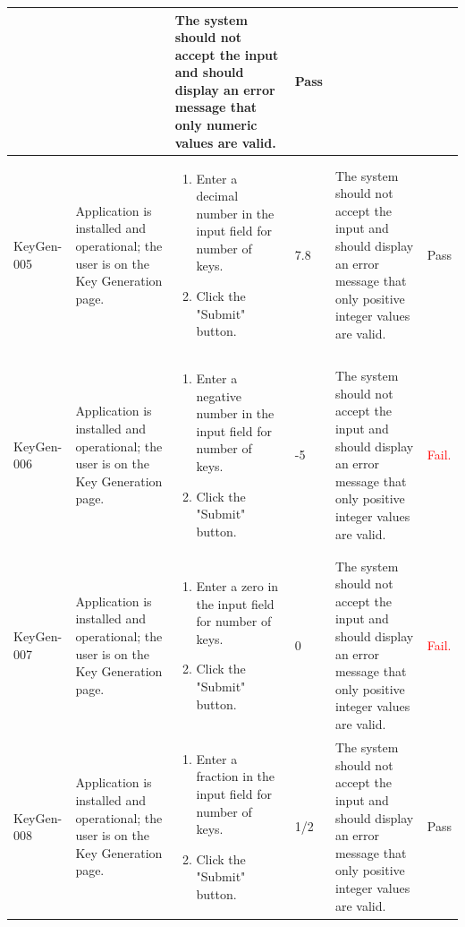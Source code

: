 \documentclass[]{final_report}
\theoremstyle{definition}
\begin{document}
\begin{longtable}{|l|p{2.5cm}|p{2.5cm}|p{2.5cm}|p{2.5cm}|p{3cm}|}
\begin{enumerate}
  \end{enumerate} &  & The system should not accept the input and should display an error message that only numeric values are valid. & Pass \\
  \hline
   KeyGen-005 & Application is installed and operational; the user is on the Key Generation page. & 
  \begin{enumerate}
  \item Enter a decimal number in the input field for number of keys.
  \item Click the "Submit" button.
  \end{enumerate} & 7.8  & The system should not accept the input and should display an error message that only positive integer values are valid. & Pass \\
  \hline
     KeyGen-006 & Application is installed and operational; the user is on the Key Generation page. & 
  \begin{enumerate}
  \item Enter a negative number in the input field for number of keys.
  \item Click the "Submit" button.
  \end{enumerate} & -5 & The system should not accept the input and should display an error message that only positive integer values are valid. & \textcolor{red}{Fail.} \\
  \hline
    KeyGen-007 & Application is installed and operational; the user is on the Key Generation page. & 
  \begin{enumerate}
  \item Enter a zero in the input field for number of keys.
   \item Click the "Submit" button.
  \end{enumerate} & 0 & The system should not accept the input and should display an error message that only positive integer values are valid. & \textcolor{red}{Fail.} \\
  \hline
    KeyGen-008 & Application is installed and operational; the user is on the Key Generation page. & 
  \begin{enumerate}
  \item Enter a fraction in the input field for number of keys.
  \item Click the "Submit" button.
  \end{enumerate} & 1/2 & The system should not accept the input and should display an error message that only positive integer values are valid. & Pass \\
  \hline
\end{longtable}
\end{document}
